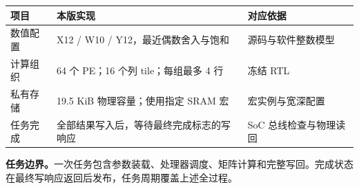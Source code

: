 \documentclass[UTF8,punct,fontset=none,zihao=-4]{ctexart}
\begin{document}
\begin{table}[H]\centering\small
\begin{tabularx}{\linewidth}{p{31mm}YY}\toprule
项目 & 本版实现 & 对应依据\\\midrule
数值配置 & X12 / W10 / Y12，最近偶数舍入与饱和 & 源码与软件整数模型\\
计算组织 & 64 个 PE；16 个列 tile；每组最多 4 行 & 冻结 RTL\\
私有存储 & 19.5 KiB 物理容量；使用指定 SRAM 宏 & 宏实例与宽深配置\\
任务完成 & 全部结果写入后，等待最终完成标志的写响应 & SoC 总线检查与物理读回\\
\bottomrule\end{tabularx}
\end{table}
\noindent\textbf{任务边界。}一次任务包含参数装载、处理器调度、矩阵计算和完整写回。完成状态在最终写响应返回后发布，任务周期覆盖上述全过程。
\clearpage
\end{document}
